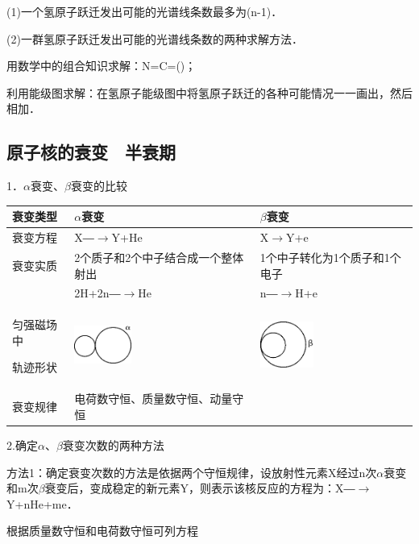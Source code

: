(1)一个氢原子跃迁发出可能的光谱线条数最多为(n-1)．

(2)一群氢原子跃迁发出可能的光谱线条数的两种求解方法．

用数学中的组合知识求解：N=C=()；

利用能级图求解：在氢原子能级图中将氢原子跃迁的各种可能情况一一画出，然后相加．
\newpage
\subsection{原子核的衰变　半衰期}

1．$\alpha$衰变、$\beta$衰变的比较

\begin{longtable}[]{@{}m{2cm}m{5cm}m{5cm}@{}}
\toprule
衰变类型 & $\alpha$衰变 & $\beta$衰变\tabularnewline
\midrule
\endhead
衰变方程 & X―$\rightarrow$Y+He & X$\rightarrow$Y+e\tabularnewline
衰变实质 & 2个质子和2个中子结合成一个整体射出 &
1个中子转化为1个质子和1个电子\tabularnewline
& 2H+2n―$\rightarrow$He & n―$\rightarrow$H+e\tabularnewline
\begin{minipage}[t]{0.30\columnwidth}\raggedright
匀强磁场中

轨迹形状\strut
\end{minipage} & \begin{minipage}[t]{0.30\columnwidth}\raggedright
\includegraphics[width=0.73611in,height=0.49028in]{media/image480.png}\strut
\end{minipage} & \begin{minipage}[t]{0.30\columnwidth}\raggedright
\includegraphics[width=0.68889in,height=0.59444in]{media/image481.png}\strut
\end{minipage}\tabularnewline
衰变规律 & 电荷数守恒、质量数守恒、动量守恒 &\tabularnewline
\bottomrule
\end{longtable}

2.确定$\alpha$、$\beta$衰变次数的两种方法

方法1：确定衰变次数的方法是依据两个守恒规律，设放射性元素X经过n次$\alpha$衰变和m次$\beta$衰变后，变成稳定的新元素Y，则表示该核反应的方程为：X―$\rightarrow$Y+nHe+me．

根据质量数守恒和电荷数守恒可列方程

